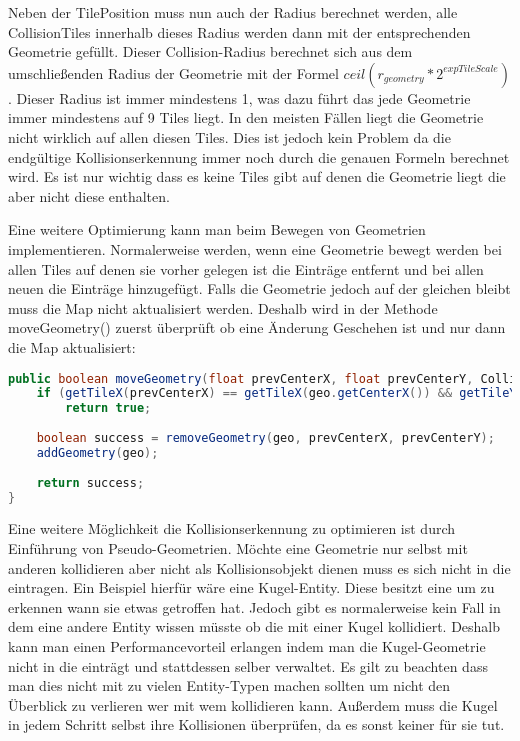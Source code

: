 Neben der TilePosition muss nun auch der Radius berechnet werden, alle CollisionTiles innerhalb dieses Radius werden dann mit der entsprechenden Geometrie gefüllt. Dieser Collision-Radius berechnet sich aus dem umschließenden Radius der Geometrie mit der Formel $ceil(r_{geometry} * 2^{expTileScale})$.
Dieser Radius ist immer mindestens 1, was dazu führt das jede Geometrie immer mindestens auf 9 Tiles liegt. In den meisten Fällen liegt die Geometrie nicht wirklich auf allen diesen Tiles. Dies ist jedoch kein Problem da die endgültige Kollisionserkennung immer noch durch die genauen Formeln berechnet wird.
Es ist nur wichtig dass es keine Tiles gibt auf denen die Geometrie liegt die aber nicht diese enthalten.

Eine weitere Optimierung kann man beim Bewegen von Geometrien implementieren. Normalerweise werden, wenn eine Geometrie bewegt werden bei allen Tiles auf denen sie vorher gelegen ist die Einträge entfernt und bei allen neuen die Einträge hinzugefügt. Falls die Geometrie jedoch auf der gleichen  bleibt muss die Map nicht aktualisiert werden. Deshalb wird in der Methode moveGeometry() zuerst überprüft ob eine Änderung Geschehen ist und nur dann die Map aktualisiert:

\doinline
\begin{lstlisting}[caption=Bewegen einer Geometrie in der CollisionMap, title=\hspace{0 pt}, language=java]
public boolean moveGeometry(float prevCenterX, float prevCenterY, CollisionGeometry geo) {
	if (getTileX(prevCenterX) == getTileX(geo.getCenterX()) && getTileY(prevCenterY) == getTileY(geo.getCenterY()))
		return true;
	
	boolean success = removeGeometry(geo, prevCenterX, prevCenterY);
	addGeometry(geo);
	
	return success;
}
\end{lstlisting}

Eine weitere Möglichkeit die Kollisionserkennung zu optimieren ist durch Einführung von Pseudo-Geometrien. Möchte eine Geometrie nur selbst mit anderen kollidieren aber nicht als Kollisionsobjekt dienen muss es sich nicht in die  eintragen. Ein Beispiel hierfür wäre eine Kugel-Entity.
Diese besitzt eine  um zu erkennen wann sie etwas getroffen hat. Jedoch gibt es normalerweise kein Fall in dem eine andere Entity wissen müsste ob die mit einer Kugel kollidiert.
Deshalb kann man einen Performancevorteil erlangen indem man die Kugel-Geometrie nicht in die  einträgt und stattdessen selber verwaltet. Es gilt zu beachten dass man dies nicht mit zu vielen Entity-Typen machen sollten um nicht den Überblick zu verlieren wer mit wem kollidieren kann.
Außerdem muss die Kugel in jedem Schritt selbst ihre Kollisionen überprüfen, da es sonst keiner für sie tut.

